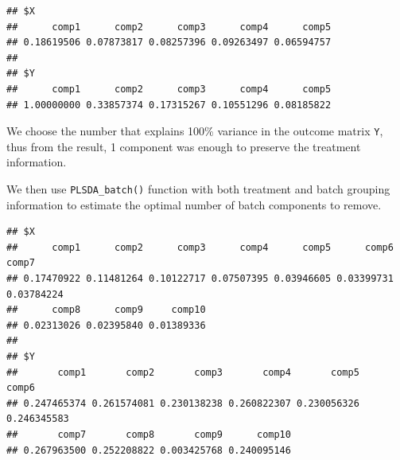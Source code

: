 \documentclass[
]{book}
\newenvironment{Shaded}{\begin{snugshade}}{\end{snugshade}}
\newcommand{\AttributeTok}[1]{\textcolor[rgb]{0.77,0.63,0.00}{#1}}
\newcommand{\CommentTok}[1]{\textcolor[rgb]{0.56,0.35,0.01}{\textit{#1}}}
\newcommand{\DecValTok}[1]{\textcolor[rgb]{0.00,0.00,0.81}{#1}}
\newcommand{\FunctionTok}[1]{\textcolor[rgb]{0.00,0.00,0.00}{#1}}
\newcommand{\NormalTok}[1]{#1}
\newcommand{\OtherTok}[1]{\textcolor[rgb]{0.56,0.35,0.01}{#1}}
\newcommand{\SpecialCharTok}[1]{\textcolor[rgb]{0.00,0.00,0.00}{#1}}
\begin{document}
\begin{verbatim}
## $X
##      comp1      comp2      comp3      comp4      comp5 
## 0.18619506 0.07873817 0.08257396 0.09263497 0.06594757 
## 
## $Y
##      comp1      comp2      comp3      comp4      comp5 
## 1.00000000 0.33857374 0.17315267 0.10551296 0.08185822
\end{verbatim}

We choose the number that explains 100\% variance in the outcome matrix \texttt{Y}, thus from the result, 1 component was enough to preserve the treatment information.

We then use \texttt{PLSDA\_batch()} function with both treatment and batch grouping information to estimate the optimal number of batch components to remove.

\begin{Shaded}
\end{Shaded}

\begin{verbatim}
## $X
##      comp1      comp2      comp3      comp4      comp5      comp6      comp7 
## 0.17470922 0.11481264 0.10122717 0.07507395 0.03946605 0.03399731 0.03784224 
##      comp8      comp9     comp10 
## 0.02313026 0.02395840 0.01389336 
## 
## $Y
##       comp1       comp2       comp3       comp4       comp5       comp6 
## 0.247465374 0.261574081 0.230138238 0.260822307 0.230056326 0.246345583 
##       comp7       comp8       comp9      comp10 
## 0.267963500 0.252208822 0.003425768 0.240095146
\end{verbatim}

\begin{Shaded}
\end{Shaded}
\end{document}
